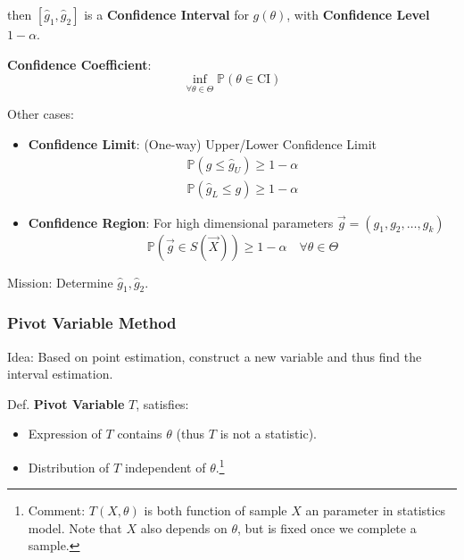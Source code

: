     then $[\hat{g}_1,\hat{g}_2]$ is a \textbf{Confidence Interval} for $g(\theta)$, with \textbf{Confidence Level} $1-\alpha$. 
    
    \textbf{Confidence Coefficient}:
    \begin{equation}\inf_{\forall\theta\in\Theta}\mathbb{P}(
        \theta\in\mathrm{CI}
    )\end{equation}

    Other cases:
    \begin{itemize}[topsep=-4pt]
        \item \textbf{Confidence Limit}: (One-way) Upper/Lower Confidence Limit
    \begin{align*}
        \mathbb{P}(g\leq \hat{g}_U)\geq 1-\alpha\\
        \mathbb{P}(\hat{g}_L\leq g)\geq 1-\alpha
    \end{align*}
        \item \textbf{Confidence Region}: For high dimensional parameters $\vec{g}=(g_1,g_2,\ldots,g_k)$
        \begin{equation}\mathbb{P}(\vec{g}\in S(\vec{X}))\geq 1-\alpha\quad \forall \theta\in\Theta \end{equation}
        
    \end{itemize}

    Mission: Determine $\hat{g}_1,\hat{g}_2$.


\subsubsection{Pivot Variable Method}\label{SubSectionPivotVariableMethod}
    Idea: Based on point estimation, construct a new variable and thus find the interval estimation.

    Def. \textbf{Pivot Variable} $T$, satisfies: 
    \begin{itemize}[itemsep= -2 pt,parsep= -2 pt]
        \item Expression of $T$ contains $\theta$ (thus $T$ is not a statistic).
        \item Distribution of $T$ independent of $\theta$.\footnote{Comment: $ T(X,\theta ) $ is both function of sample $ X $ an parameter in statistics model. Note that $ X $ also depends on $ \theta  $, but is fixed once we complete a sample.}
    \end{itemize}

